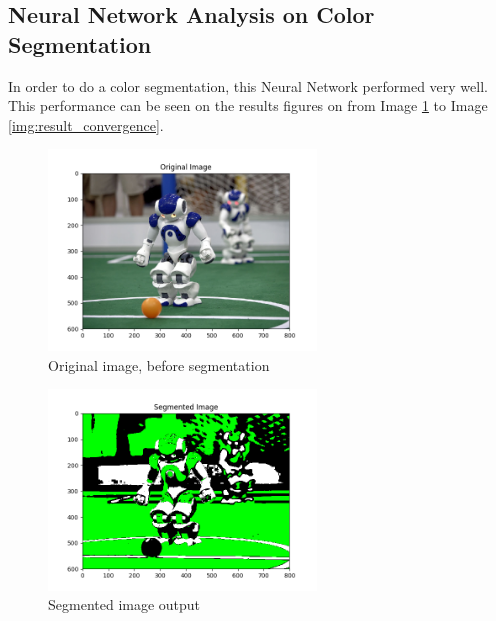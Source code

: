 \documentclass[journal]{IEEEtran}
\begin{document}
\subsection{Neural Network Analysis on Color Segmentation}

In order to do a color segmentation, this Neural Network performed very well. This performance can be seen on the results figures on from Image \ref{img:result_original_img} to Image \ref{img:result_convergence}.

\begin{figure}
  \begin{center}
  \includegraphics[width=2.8in]{./../code/result/original_image.png}
  \caption{Original image, before segmentation}
  \label{img:result_original_img}
  \end{center}
\end{figure}

\begin{figure}
  \begin{center}
  \includegraphics[width=2.8in]{./../code/result/segmented_image.png}
  \caption{Segmented image output}
  \label{img:result_segmented_img}
  \end{center}
\end{figure}
\end{document}

